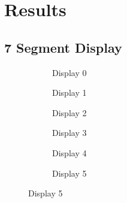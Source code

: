 \documentclass[10pt,a4paper]{article}
\begin{document}
	\section{Results}
	\subsection{7 Segment Display}
		\begin{figure}[H]
			\begin{subfigure}{3cm}
				\caption{Display 0}
			\end{subfigure}
			\begin{subfigure}{3cm}
				\caption{Display 1}
			\end{subfigure}
			\begin{subfigure}{3cm}
				\caption{Display 2}
			\end{subfigure}
		
			\begin{subfigure}{3cm}
				\caption{Display 3}
			\end{subfigure}
			\begin{subfigure}{3cm}
				\caption{Display 4}
			\end{subfigure}	
			\begin{subfigure}{3cm}
				\caption{Display 5}
			\end{subfigure}		
		

\end{figure}
\end{document}
